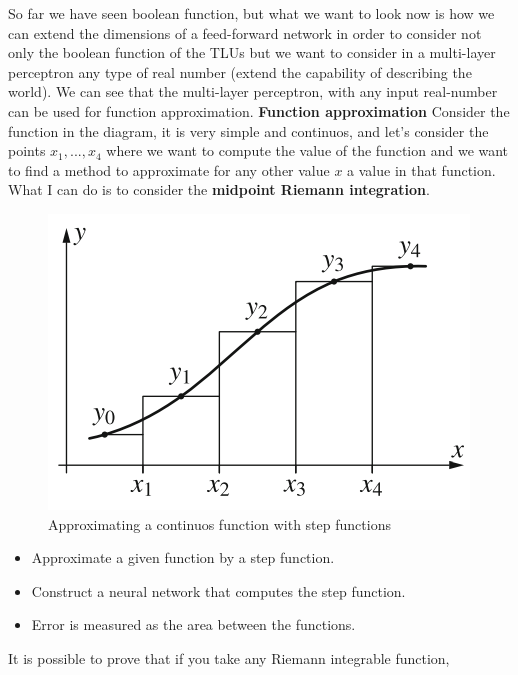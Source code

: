 \documentclass{article}
\begin{document}
So far we have seen boolean function, but what we want to look now is how we can extend
the dimensions of a feed-forward network in order to consider not only
the boolean function of the TLUs but we want to consider in a multi-layer
perceptron any type of real number (extend the capability of describing the world).
\newline\newline
We can see that the multi-layer perceptron,
with any input real-number can be used for function approximation.
\newline\newline\noindent\textbf{Function approximation}\newline
Consider the function in the diagram, it is very simple and continuos,
and let's consider the points $x_1,...,x_4$ where we want to compute
the value of the function and we want to find a method to approximate for any other value
$x$ a value in that function.
\newline\newline
What I can do is to consider the \textbf{midpoint Riemann integration}.
\begin{figure}
    \centering
    \includegraphics[scale=0.5]{images/midpoint_integra.png}
    \caption{Approximating a continuos function with step functions}
    \label{fig:midpoint_int}
\end{figure}
\begin{itemize}
    \item Approximate a given function by a step function.
    \item Construct a neural network that computes the step function.
    \item Error is measured as the area between the functions.
\end{itemize}
It is possible to prove that if you take any Riemann integrable function,
\end{document}
